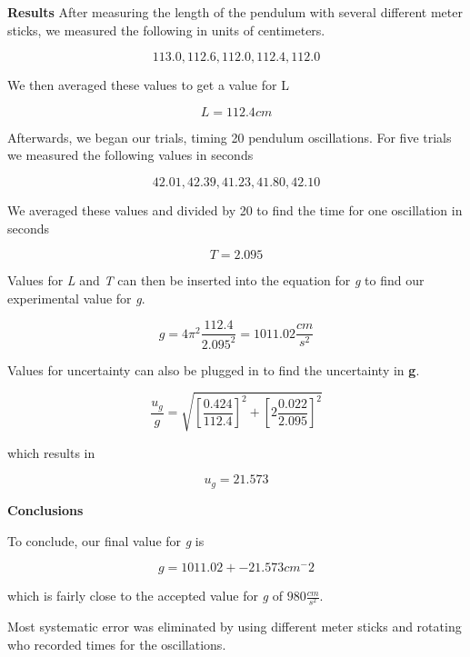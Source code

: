 \documentclass[12pt]{article}
\begin{document}
\newpage
\textbf{Results}\newline
After measuring the length of the pendulum with several different meter sticks, we measured the following
in units of centimeters.

\[ 113.0, 112.6, 112.0, 112.4, 112.0 \]

We then averaged these values to get a value for L

\[ L = 112.4 cm \]

Afterwards, we began our trials, timing 20 pendulum oscillations. For five trials we measured
the following values in seconds

\[ 42.01, 42.39, 41.23, 41.80, 42.10 \]

We averaged these values and divided by 20 to find the time for one oscillation in seconds

\[ T = 2.095 \]

Values for \textit{L} and \textit{T} can then be inserted into the equation for \textit{g}
to find our experimental value for \textit{g}.

\[ g = 4\pi^2 \frac{112.4}{2.095^2} = 1011.02 \frac{cm}{s^2} \]

Values for uncertainty can also be plugged in to find the uncertainty in \textbf{g}.

\[ \frac{u_{g}}{g} = \sqrt{ [\frac {0.424}{112.4}]^2 + [2 \frac {0.022}{2.095}]^2} \]

\newpage
which results in

\[ u_{g} = 21.573 \]

\textbf{Conclusions}

To conclude, our final value for \textit{g} is

\[ g = 1011.02 +- 21.573 cm^-2 \]

which is fairly close to the accepted value for \textit{g} of $980 \frac{cm}{s^2}$.

Most systematic error was eliminated by using different meter sticks and rotating
who recorded times for the oscillations. 
\end{document}
